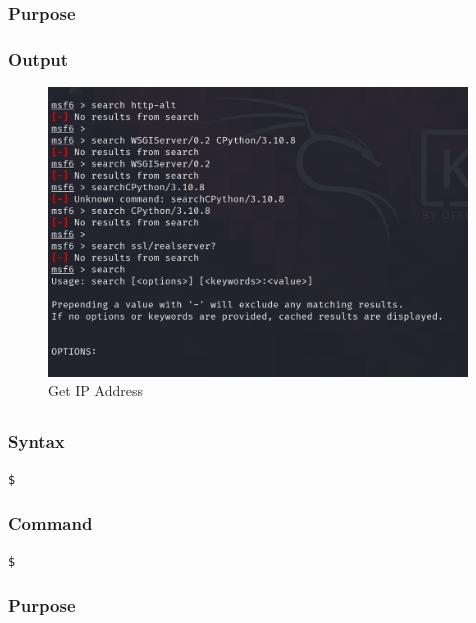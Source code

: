 \documentclass[11pt]{article}
\begin{document}
\subsubsection*{Purpose}

\subsubsection*{Output}
\begin{figure}[H]
    \centering
    \includegraphics[width=0.99\textwidth]{a3_ss (17).png}
    \caption{Get IP Address}
    \label{fig:1}
\end{figure}
\subsection{}

\subsubsection*{Syntax}
\begin{verbatim}
$
\end{verbatim}

\subsubsection*{Command}
\begin{verbatim}
$
\end{verbatim}

\subsubsection*{Purpose}
\end{document}
